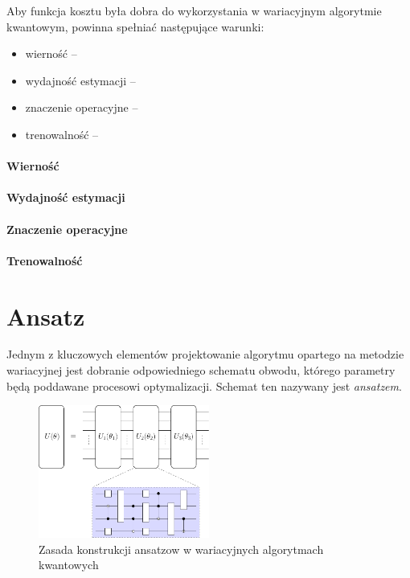 \documentclass[a4paper,11pt]{article}
\begin{document}
Aby funkcja kosztu była dobra do wykorzystania w wariacyjnym algorytmie kwantowym, powinna spełniać następujące warunki:
\begin{itemize}
	\item wierność -- 
	\item wydajność estymacji -- 
	\item znaczenie operacyjne --
	\item trenowalność -- 
\end{itemize}


\paragraph{Wierność}
\paragraph{Wydajność estymacji}
\paragraph{Znaczenie operacyjne}
\paragraph{Trenowalność}

\newpage 

\hypertarget{typy-ansatzow}{%
	\section{Ansatz}\label{typy-ansatzow}}

Jednym z kluczowych elementów projektowanie algorytmu opartego na metodzie wariacyjnej jest dobranie odpowiedniego schematu obwodu, którego parametry będą poddawane procesowi optymalizacji. Schemat ten nazywany jest \emph{ansatzem}.


\begin{figure}[ht!]
	\centering
	\includegraphics[width=0.5\textwidth]{ansatz.pdf}
	\caption{Zasada konstrukcji ansatzow w wariacyjnych algorytmach kwantowych}
\end{figure}
\end{document}

